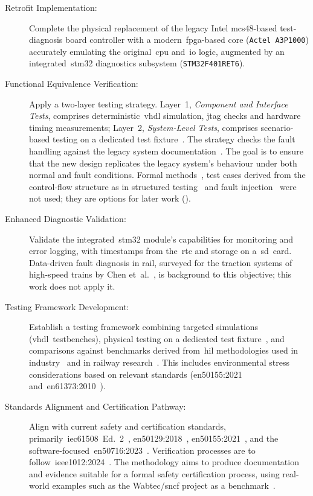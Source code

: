 \begin{description}
	\item[Retrofit Implementation:] Complete the physical replacement of the legacy Intel \gls{mcs48}-based test-diagnosis board controller with a modern~\gls{fpga}-based core (\texttt{Actel~A3P1000}) accurately emulating the original~\gls{cpu} and~\gls{io} logic, augmented by an integrated~\gls{stm32} diagnostics subsystem (\texttt{STM32F401RET6}).
	\item[Functional Equivalence Verification:] Apply a two-layer testing strategy. Layer~1, \textit{Component and Interface Tests}, comprises deterministic~\gls{vhdl} simulation, \gls{jtag} checks and hardware timing measurements; Layer~2, \textit{System-Level Tests}, comprises scenario-based testing on a dedicated test fixture~\cite{dolata2023}. The strategy checks the fault handling against the legacy system documentation~\cite{rexroth1992wsp}. The goal is to ensure that the new design replicates the legacy system's behaviour under both normal and fault conditions. Formal methods~\cite{formal_verification_rail_2023}, test cases derived from the control-flow structure as in structured testing~\cite{watson1996} and fault injection~\cite{ziade2004faultinjection} were not used; they are options for later work ().
	\item[Enhanced Diagnostic Validation:] Validate the integrated~\gls{stm32} module's capabilities for monitoring and error logging, with timestamps from the~\gls{rtc} and storage on a~\gls{sd}~card. Data-driven fault diagnosis in rail, surveyed for the traction systems of high-speed trains by Chen et~al.~\cite{chen2020diagnostics}, is background to this objective; this work does not apply it.
	\item[Testing Framework Development:] Establish a testing framework combining targeted simulations (\gls{vhdl}~testbenches), physical testing on a dedicated test fixture~\cite{dolata2023}, and comparisons against benchmarks derived from~\gls{hil} methodologies used in industry~\cite{zhou_wu_2020} and in railway research~\cite{hil_rail_suspension_2023}. This includes environmental stress considerations based on relevant standards (\gls{en50155}:2021~\cite{en50155_2021} and~\gls{en61373}:2010~\cite{en61373_2010}).
	\item[Standards Alignment and Certification Pathway:] Align with current safety and certification standards, primarily~\gls{iec61508}~Ed.~2~\cite{iec61508_2010}, \gls{en50129}:2018~\cite{en50129_2018}, \gls{en50155}:2021~\cite{en50155_2021}, and the software-focused~\gls{en50716}:2023~\cite{en50716_2023}. Verification processes are to follow~\gls{ieee1012}:2024~\cite{ieee1012_2024}. The methodology aims to produce documentation and evidence suitable for a formal safety certification process, using real-world examples such as the Wabtec/\gls{sncf} project as a benchmark~\cite{wabtec_wsp_cert_2022}.

\end{description}
